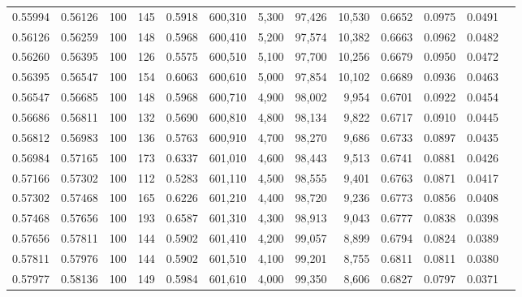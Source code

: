 \begin{tabular}{rrrrrrrrrrrrr}
0.55994 & 0.56126 &   100 & 145 &                                     0.5918 & 600,310 &   5,300 &  97,426 &  10,530 & 0.6652 & 0.0975 & 0.0491 \\
0.56126 & 0.56259 &   100 & 148 &                                     0.5968 & 600,410 &   5,200 &  97,574 &  10,382 & 0.6663 & 0.0962 & 0.0482 \\
0.56260 & 0.56395 &   100 & 126 &                                     0.5575 & 600,510 &   5,100 &  97,700 &  10,256 & 0.6679 & 0.0950 & 0.0472 \\
0.56395 & 0.56547 &   100 & 154 &                                     0.6063 & 600,610 &   5,000 &  97,854 &  10,102 & 0.6689 & 0.0936 & 0.0463 \\
0.56547 & 0.56685 &   100 & 148 &                                     0.5968 & 600,710 &   4,900 &  98,002 &   9,954 & 0.6701 & 0.0922 & 0.0454 \\
0.56686 & 0.56811 &   100 & 132 &                                     0.5690 & 600,810 &   4,800 &  98,134 &   9,822 & 0.6717 & 0.0910 & 0.0445 \\
0.56812 & 0.56983 &   100 & 136 &                                     0.5763 & 600,910 &   4,700 &  98,270 &   9,686 & 0.6733 & 0.0897 & 0.0435 \\
0.56984 & 0.57165 &   100 & 173 &                                     0.6337 & 601,010 &   4,600 &  98,443 &   9,513 & 0.6741 & 0.0881 & 0.0426 \\
0.57166 & 0.57302 &   100 & 112 &                                     0.5283 & 601,110 &   4,500 &  98,555 &   9,401 & 0.6763 & 0.0871 & 0.0417 \\
0.57302 & 0.57468 &   100 & 165 &                                     0.6226 & 601,210 &   4,400 &  98,720 &   9,236 & 0.6773 & 0.0856 & 0.0408 \\
0.57468 & 0.57656 &   100 & 193 &                                     0.6587 & 601,310 &   4,300 &  98,913 &   9,043 & 0.6777 & 0.0838 & 0.0398 \\
0.57656 & 0.57811 &   100 & 144 &                                     0.5902 & 601,410 &   4,200 &  99,057 &   8,899 & 0.6794 & 0.0824 & 0.0389 \\
0.57811 & 0.57976 &   100 & 144 &                                     0.5902 & 601,510 &   4,100 &  99,201 &   8,755 & 0.6811 & 0.0811 & 0.0380 \\
0.57977 & 0.58136 &   100 & 149 &                                     0.5984 & 601,610 &   4,000 &  99,350 &   8,606 & 0.6827 & 0.0797 & 0.0371 \\

\end{tabular}
